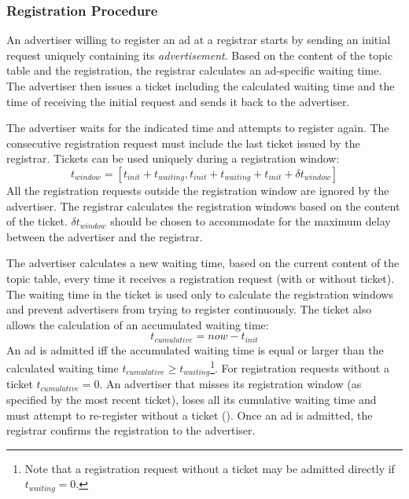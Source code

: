 \subsubsection{Registration Procedure}
An advertiser willing to register an ad at a registrar starts by sending an
initial request uniquely containing its \emph{advertisement}. Based on the
content of the topic table and the registration, the registrar calculates an
ad-specific waiting time. The advertiser then issues a ticket including the
calculated waiting time and the time of receiving the initial request and sends it back to the advertiser.

The advertiser waits for the indicated time and attempts to register again. The consecutive registration request must include the last ticket issued by the registrar. Tickets can be used uniquely during a registration window:
\begin{equation}\label{eq:registration_window}
    t_\textit{window} = [t_\textit{init} + t_\textit{waiting}, t_\textit{init} + t_\textit{waiting} + t_\textit{init} + \delta t_\textit{window}]
\end{equation}
All the registration requests outside the registration window are ignored by the advertiser. The registrar calculates the registration windows based on the content of the ticket. $\delta t_\textit{window}$ should be chosen to accommodate for the maximum delay between the advertiser and the registrar. 

The advertiser calculates a new waiting time, based on the current content of
the topic table, every time it receives a registration request (with or without
ticket). The waiting time in the ticket is used only to calculate the
registration windows and prevent advertisers from trying to register
continuously. The ticket also allows the calculation of an accumulated waiting time:
\begin{equation}
    t_\textit{cumulative} = \textit{now} - t_\textit{init}
\end{equation}
An ad is admitted iff the accumulated waiting time is equal or larger than the calculated waiting time $t_\textit{cumulative} \ge t_\textit{waiting}$\footnote{Note that a registration request without a ticket may be admitted directly if $t_\textit{waiting}=0$.}. For registration requests without a ticket $t_\textit{cumulative} = 0$. An advertiser that misses its registration window (as specified by the most recent ticket), loses all its cumulative waiting time and must attempt to re-register without a ticket (). Once an ad is admitted, the registrar confirms the registration to the advertiser.

